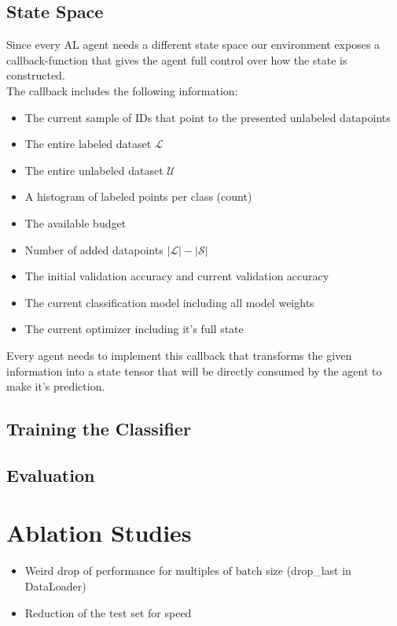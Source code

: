 \documentclass[]{article}
\begin{document}
\subsection{State Space}
Since every AL agent needs a different state space our environment exposes a callback-function that gives the agent full control over how the state is constructed. \\ [1mm]
The callback includes the following information:
\begin{itemize}
	\item The current sample of IDs that point to the presented unlabeled datapoints
	\item The entire labeled dataset $\mathcal{L}$
	\item The entire unlabeled dataset $\mathcal{U}$
	\item A histogram of labeled points per class (count)
	\item The available budget
	\item Number of added datapoints $|\mathcal{L}| - |\mathcal{S}|$
	\item The initial validation accuracy and current validation accuracy
	\item The current classification model including all model weights
	\item The current optimizer including it's full state
\end{itemize}
Every agent needs to implement this callback that transforms the given information into a state tensor that will be directly consumed by the agent to make it's prediction.

\subsection{Training the Classifier}\label{sec:training_the_classifier}
\subsection{Evaluation}\label{sec:evaluation}


\section{Ablation Studies}
\begin{itemize}
	\item Weird drop of performance for multiples of batch size (drop\_last in DataLoader)
	\item Reduction of the test set for speed
\end{itemize}



 
\end{document}
